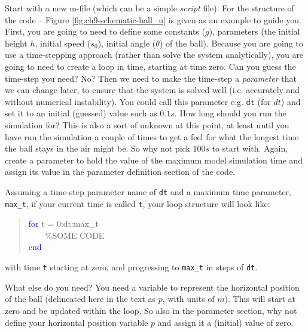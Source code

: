 \documentclass{tufte-book} %
\newenvironment{docspec}{\begin{quotation}\ttfamily\parskip0pt\parindent0pt\ignorespaces}{\end{quotation}}
\begin{document}
 Start with a new \textsf{m-file} (which can be a simple \textit{script} file). For the structure of the code -- Figure \ref{fig:ch9-schematic-ball_u} is given as an example to guide you. First, you are going to need to define some constants (\(g\)), parameters (the initial height \(h\), initial speed (\(s_{0}\)), initial angle (\(\theta\)) of the ball). 
Because you are going to use a time-stepping approach (rather than solve the system analytically), you are going to need to create a loop in time, starting at time zero. Can you guess the time-step you need? No? Then we need to make the time-step a \textit{parameter} that we can change later, to ensure that the system is solved well (i.e. accurately and without numerical instability). You could call this parameter e.g. \texttt{dt} (for \(dt\)) and set it to an initial (guessed) value such as \(0.1s\). How long should you run the simulation for? This is also a sort of unknown at this point, at least until you have run the simulation a couple of times to get a feel for what the longest time the ball stays in the air might be. So why not pick \(100s\) to start with. Again, create a parameter to hold the value of the maximum model simulation time and assign its value in the parameter definition section of the code. 

Assuming a time-step parameter name of \texttt{dt} and a maximum time parameter, \texttt{max\_t}, if your current time is called \texttt{t}, your loop structure will look like:
\begin{docspec}
\textcolor{blue}{for} t = 0:dt:max\_t
\\ \ \ \ \ \textcolor[rgb]{0,0.501961,0}{\%SOME CODE}
\\\textcolor{blue}{end}
\end{docspec}
with time \texttt{t} starting at zero, and progressing to \texttt{max\_t} in steps of \texttt{dt}.

What else do you need? You need a variable to represent the horizontal position of the ball (delineated here in the text as \(p\), with units of \(m\)). This will start at zero and be updated within the loop. So also in the parameter section, why not define your horizontal position variable \(p\) and assign it a (initial) value of zero.
\end{document}
